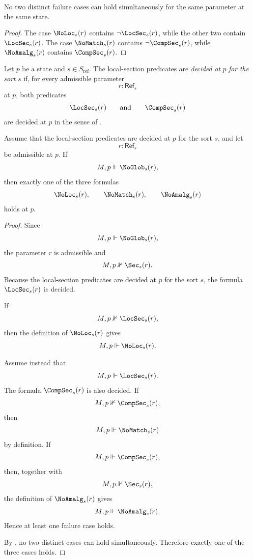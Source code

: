 \begin{proposition}\label{prop:null-modes-exclusive}
No two distinct failure cases can hold simultaneously for the same parameter at the same state.
\end{proposition}

\begin{proof}
The case $\NoLoc_s(r)$ contains $\neg\LocSec_s(r)$, while the other two contain $\LocSec_s(r)$. The case $\NoMatch_s(r)$ contains $\neg\CompSec_s(r)$, while $\NoAmalg_s(r)$ contains $\CompSec_s(r)$.
\end{proof}

\begin{definition}\label{def:decomposition-decidability}
Let $p$ be a state and $s\in S_{\mathrm{ref}}$. The local-section predicates are \emph{decided at $p$ for the sort $s$} if, for every admissible parameter
\[
r:\mathsf{Ref}_s
\]
at $p$, both predicates
\[
\LocSec_s(r)
\qquad\text{and}\qquad
\CompSec_s(r)
\]
are decided at $p$ in the sense of .
\end{definition}

\begin{proposition}\label{prop:null-trichotomy}
Assume that the local-section predicates are decided at $p$ for the sort $s$, and let
\[
r:\mathsf{Ref}_s
\]
be admissible at $p$. If
\[
M,p\Vdash \NoGlob_s(r),
\]
then exactly one of the three formulas
\[
\NoLoc_s(r),\qquad
\NoMatch_s(r),\qquad
\NoAmalg_s(r)
\]
holds at $p$.
\end{proposition}

\begin{proof}
Since
\[
M,p\Vdash \NoGlob_s(r),
\]
the parameter $r$ is admissible and
\[
M,p\nVdash \Sec_s(r).
\]
Because the local-section predicates are decided at $p$ for the sort $s$, the formula $\LocSec_s(r)$ is decided.

If
\[
M,p\nVdash \LocSec_s(r),
\]
then the definition of $\NoLoc_s(r)$ gives
\[
M,p\Vdash \NoLoc_s(r).
\]

Assume instead that
\[
M,p\Vdash \LocSec_s(r).
\]
The formula $\CompSec_s(r)$ is also decided. If
\[
M,p\nVdash \CompSec_s(r),
\]
then
\[
M,p\Vdash \NoMatch_s(r)
\]
by definition. If
\[
M,p\Vdash \CompSec_s(r),
\]
then, together with
\[
M,p\nVdash \Sec_s(r),
\]
the definition of $\NoAmalg_s(r)$ gives
\[
M,p\Vdash \NoAmalg_s(r).
\]
Hence at least one failure case holds.

By , no two distinct cases can hold simultaneously. Therefore exactly one of the three cases holds.
\end{proof}

